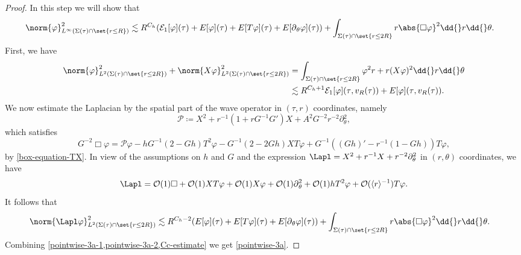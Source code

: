 \documentclass[10pt, reqno]{amsart}
\begin{document}
\begin{proof}
 In this step we will show that
\begin{equation}\label{pointwise-3a}
\begin{split}
\norm{\varphi{}}_{L^\infty(\Sigma{}(\tau{})\cap \set{r\le R})}^2 &\lesssim R^{C_h}(\mathcal{E}_1[\varphi{}](\tau{}) + E[\varphi{}](\tau{}) + E[T\varphi{}](\tau{}) + E[\partial{}_\theta{}\varphi{}](\tau{}))+ \int _{\Sigma{}(\tau{})\cap \set{r\le 2R}}r\abs{\Box{}\varphi{}}^2\dd{}r\dd{}\theta{}.
\end{split}
\end{equation}
First, we have
\begin{equation}\label{pointwise-3a-1}
\begin{split}
\norm{\varphi{}}_{L^2(\Sigma{}(\tau{})\cap \set{r\le 2R})}^2 + \norm{X\varphi{}}_{L^2(\Sigma{}(\tau{})\cap \set{r\le 2R})}^2 &=  \int _{\Sigma{}(\tau{})\cap \set{r\le 2R}}\varphi^2r + r(X\varphi{})^2\dd{}r\dd{}\theta{}\\
&\lesssim R^{C_h+1}\mathcal{E}_1[\varphi{}](\tau{},v_R(\tau{})) + E[\varphi{}](\tau{},v_R(\tau{})).
\end{split}
\end{equation}
We now estimate the Laplacian by the spatial part of the wave operator in
\((\tau{},r)\) coordinates, namely
\begin{equation}
\mathcal{P}\coloneqq{}X^2 + r^{-1}(1 + rG^{-1}G')X + A^2G^{-2}r^{-2}\partial{}_\theta^2,
\end{equation}
which satisfies
\begin{equation}
G^{-2}\Box{}\varphi{} = \mathcal{P}\varphi{}  -hG^{-1}(2-Gh)T^2\varphi{} - G^{-1}(2-2Gh)XT\varphi{} + G^{-1}((Gh)' - r^{-1}(1-Gh))T\varphi{},
\end{equation}
by \cref{box-equation-TX}. In view of the assumptions on \(h\) and \(G\) and the
expression \(\Lapl = X^2 + r^{-1}X + r^{-2}\partial_\theta^2\) in \((r,\theta{})\) coordinates, we have
\begin{equation}\label{laplacian-expression}
\Lapl =\mathcal{O}(1)\Box{}+\mathcal{O}(1)XT\varphi{} + \mathcal{O}(1)X\varphi{} + \mathcal{O}(1)\partial{}_\theta^2 + \mathcal{O}(1)hT^2\varphi{} + \mathcal{O}(\langle{}r\rangle{}^{-1})T\varphi{}.
\end{equation}
It follows that
\begin{equation}\label{pointwise-3a-2}
\begin{split}
&\norm{\Lapl \varphi{}}_{L^2(\Sigma{}(\tau{})\cap \set{r\le 2R})}^2 \lesssim R^{C_h-2}(E[\varphi{}](\tau{}) + E[T\varphi{}](\tau{}) + E[\partial{}_\theta{}\varphi{}](\tau{})) + \int _{\Sigma{}(\tau{})\cap \set{r\le 2R}}r\abs{\Box{}\varphi{}}^2\dd{}r\dd{}\theta{}.
\end{split}
\end{equation}
Combining \cref{pointwise-3a-1,pointwise-3a-2,Cc-estimate} we get \cref{pointwise-3a}.


\end{proof}
\end{document}
